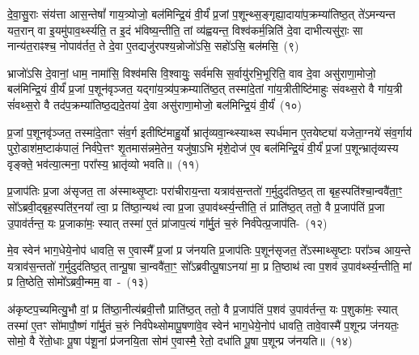 {\anuvakamend[{इ॒न्द्रि॒याव॑ती॒ भूत्या॑ उ॒तैका॒न्नप॑ञ्चा॒शच्च॑}]}%

दे॒वा॒सु॒राः संय॑त्ता आस॒न्तेषां᳚ गाय॒त्र्योजो॒ बल॑मिन्द्रि॒यं वी॒र्यं॑ प्र॒जां प॒शून्थ्स॒ङ्गृह्या॒दाया॑प॒क्रम्या॑तिष्ठ॒त् ते॑\-ऽमन्यन्त यत॒रान् वा इ॒यमु॑पाव॒र्थ्स्यति॒ त इ॒दं भ॑विष्य॒न्तीति॒ तां व्य॑ह्वयन्त॒ विश्व॑कर्म॒न्निति॑ दे॒वा दाभीत्यसु॑राः॒ सा नान्य॑त॒राꣴश्च॒ नोपाव॑र्तत॒ ते दे॒वा ए॒तद्यजु॑रपश्य॒न्नोजो॑\-ऽसि॒ सहो॑\-ऽसि॒ बल॑मसि॒~(९)

भ्राजो॑\-ऽसि दे॒वानां॒ धाम॒ नामा॑सि॒ विश्व॑मसि वि॒श्वायुः॒ सर्व॑मसि स॒र्वायु॑रभि॒भूरिति॒ वाव दे॒वा असु॑राणा॒मोजो॒ बल॑मिन्द्रि॒यं वी॒र्यं॑ प्र॒जां प॒शून॑वृञ्जत॒ यद्गा॑य॒त्र्य॑प॒क्रम्याति॑ष्ठ॒त् तस्मा॑दे॒तां गा॑य॒त्रीतीष्टि॑माहुः संवथ्स॒रो वै गा॑य॒त्री सं॑वथ्स॒रो वै तद॑प॒क्रम्या॑तिष्ठ॒द्यदे॒तया॑ दे॒वा असु॑राणा॒मोजो॒ बल॑मिन्द्रि॒यं वी॒र्यं॑~(१०)

प्र॒जां प॒शूनवृ॑ञ्जत॒ तस्मा॑दे॒ताꣳ सं॑व॒र्ग इतीष्टि॑माहु॒र्यो भ्रातृ॑व्यवा॒न्थ्स्याथ्स स्पर्ध॑मान ए॒तयेष्ट्या॑ यजेता॒ग्नये॑ संव॒र्गाय॑ पुरो॒डाश॑\-म॒ष्टा\-क॑पालं॒ निर्व॑पे॒त्तꣳ शृ॒तमास॑न्नमे॒तेन॒ यजु॑षा॒\-ऽभि मृ॑शे॒दोज॑ ए॒व बल॑मिन्द्रि॒यं वी॒र्यं॑ प्र॒जां प॒शून्भ्रातृ॑व्यस्य वृङ्क्ते॒ भव॑त्या॒त्मना॒ परा᳚स्य॒ भ्रातृ॑व्यो भवति॥~(११)

{\anuvakamend[{बल॑मस्ये॒तया॑ दे॒वा असु॑राणा॒मोजो॒ बल॑मिन्द्रि॒यं वी॒र्यं॑ पञ्च॑चत्वारिꣳशच्च}]}%

प्र॒जा\-प॑तिः प्र॒जा अ॑सृजत॒ ता अ॑स्माथ्सृ॒ष्टाः परा॑चीराय॒न्ता यत्राव॑स॒न्ततो॑ ग॒र्मुदुद॑तिष्ठ॒त् ता बृह॒स्पति॑श्चा॒न्ववै॑ता॒ꣳ॒ सो᳚\-ऽब्रवी॒द्बृह॒स्पति॑र॒नया᳚ त्वा॒ प्र ति॑ष्ठा॒न्यथ॑ त्वा प्र॒जा उ॒पाव॑र्थ्स्य॒न्तीति॒ तं प्राति॑ष्ठ॒त् ततो॒ वै प्र॒जा\-प॑तिं प्र॒जा उ॒पाव॑र्तन्त॒ यः प्र॒जाका॑मः॒ स्यात् तस्मा॑ ए॒तं प्रा॑जाप॒त्यं गा᳚र्मु॒तं च॒रुं निर्व॑पेत्प्र॒जा\-प॑ति-~(१२)

मे॒व स्वेन॑ भाग॒धेये॒नोप॑ धावति॒ स ए॒वास्मै᳚ प्र॒जां प्र ज॑नयति प्र॒जा\-प॑तिः प॒शून॑सृजत॒ ते᳚\-ऽस्माथ्सृ॒ष्टाः परा᳚ञ्च आय॒न्ते यत्राव॑स॒न्ततो॑ ग॒र्मुदुद॑तिष्ठ॒त् तान्पू॒षा चा॒न्ववै॑ता॒ꣳ॒ सो᳚\-ऽब्रवीत्पू॒षा\-ऽनया॑ मा॒ प्र ति॒ष्ठाथ॑ त्वा प॒शव॑ उ॒पाव॑र्थ्स्य॒न्तीति॒ मां प्र ति॒ष्ठेति॒ सोमो᳚\-ऽब्रवी॒न्मम॒ \mbox{वा~-~(१३)}

अ॑कृष्टप॒च्यमित्यु॒भौ वां॒ प्र ति॑ष्ठा॒नीत्य॑ब्रवी॒त्तौ प्राति॑ष्ठ॒त् ततो॒ वै प्र॒जा\-प॑तिं प॒शव॑ उ॒पाव॑र्तन्त॒ यः प॒शुका॑मः॒ स्यात् तस्मा॑ ए॒तꣳ सो॑मापौ॒ष्णं गा᳚र्मु॒तं च॒रुं निर्व॑पेथ्सोमापू॒षणा॑वे॒व स्वेन॑ भाग॒धेये॒नोप॑ धावति॒ तावे॒वास्मै॑ प॒शून्प्र ज॑नयतः॒ सोमो॒ वै रे॑तो॒धाः पू॒षा प॑शू॒नां प्र॑जनयि॒ता सोम॑ ए॒वास्मै॒ रेतो॒ दधा॑ति पू॒षा प॒शून्प्र ज॑नयति॥~(१४)

